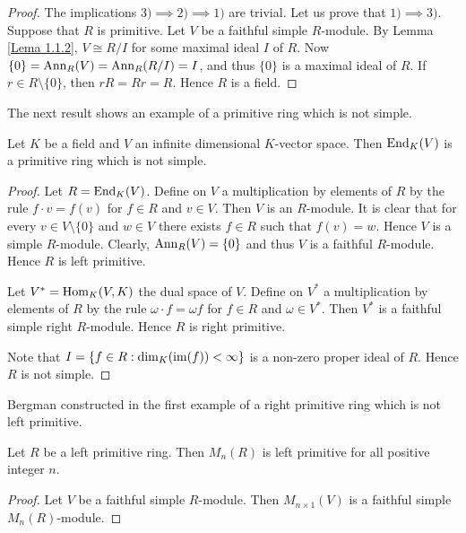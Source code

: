 \begin{proof}
    The implications $3)\implies 2)\implies 1)$ are trivial. Let us prove that $1)\implies 3)$. 
    Suppose that $R$ is primitive. Let $V$ be
a faithful simple $R$-module. By Lemma \ref{Lema 1.1.2}, $V\cong R/I$ for some maximal ideal $I$ of $R$. 
Now $\{0\}=\operatorname{Ann}_R(V)=\operatorname{Ann}_R(R/I)=I$, and thus $\{0\}$ is a maximal ideal of $R$. If $r\in R\setminus \{ 0\}$, then
$rR=Rr=R$. Hence $R$ is a field.
\end{proof}

The next result shows an example of a primitive ring which is not simple.

\begin{proposition}\label{Prop1.2.2}
Let $K$ be a field and $V$ an infinite dimensional $K$-vector space. Then
$\operatorname{End}_K(V)$ is a primitive ring which is not simple.
\end{proposition}

\begin{proof}
Let $R=\operatorname{End}_K(V)$. Define on $V$ a multiplication by elements of $R$ by the rule 
$f\cdot v=f(v)$ for $f\in R$ and $v\in V$.
Then $V$ is an $R$-module.
It is clear that for every $v\in V\setminus \{ 0\}$ and $w\in V$ there exists
$f\in R$ such that $f(v)=w$. Hence $V$ is a simple $R$-module. Clearly, 
$\operatorname{Ann}_R(V)=\{0\}$ and thus $V$ is a faithful $R$-module. 
Hence $R$ is left primitive.

Let $V^*=\operatorname{Hom}_K(V,K)$ the dual space of $V$. Define on $V^*$ a multiplication by elements of $R$ by the rule  
$\omega\cdot f=\omega f$ for $f\in R$ and $\omega\in V^*$. Then $V^*$ is a
faithful simple right $R$-module. Hence $R$ is right primitive.

Note that $I=\{ f\in R : \dim_K(\operatorname{im}(f))<\infty\}$ 
is a non-zero proper ideal of $R$. 
Hence $R$ is not simple. 
\end{proof}

Bergman constructed in \cite{MR175940,MR167497} 
the first example of a right primitive ring which is not left primitive. 

\begin{proposition}
\label{Prop1.2.3}
Let $R$ be a left primitive ring. Then $M_n(R)$ is left primitive for all positive integer $n$.
\end{proposition}

\begin{proof}
Let $V$ be a faithful simple $R$-module. Then $M_{n\times 1}(V)$ is a faithful simple $M_n(R)$-module.
\end{proof}



